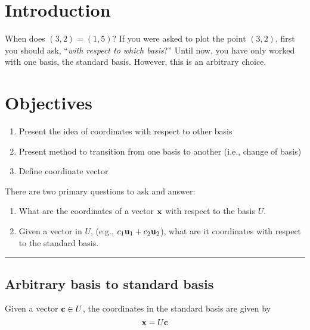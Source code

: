 %
\section*{Introduction}

When does $(3,2) = (1,5)$?  If you were asked to plot the point $(3,2)$, first you should ask, ``\textit{with respect to which basis}?''  Until now, you have only worked with one basis, the standard basis.  However, this is an arbitrary choice.  

\section*{Objectives}
\begin{enumerate}
	\item Present the idea of coordinates with respect to other basis
	\item Present method to transition from one basis to another (i.e., change of basis)
 	\item Define coordinate vector
    
\end{enumerate}





There are two primary questions to ask and answer:

\begin{enumerate}
	\item What are the coordinates of a vector ${\bf x}$ with respect to the basis $U$.
	\item Given a vector in $U$, (e.g., $c_1{\bf u}_1 + c_2 {\bf u}_2$), what are it coordinates with respect to the standard basis.
\end{enumerate}
\rule[0.01in]{\textwidth}{0.0025in}



 
 
 
 
 
 \subsection*{Arbitrary basis to standard basis}
 Given a vector ${\bf c} \in U$, the coordinates in the standard basis are given by
 \[   {\bf x} = U{\bf c} \] 


